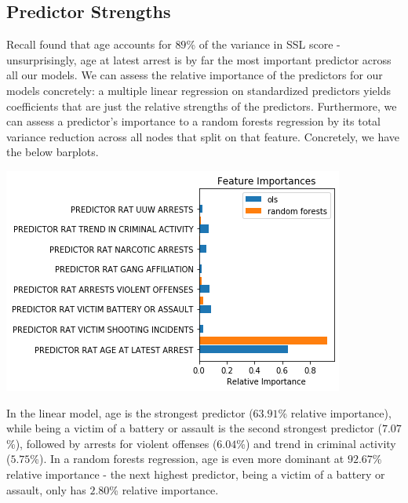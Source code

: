 \subsection{Predictor Strengths}
Recall \cite{upturn} found that age accounts for $89$\% of the variance in SSL score - unsurprisingly, age at latest arrest is by far the most important predictor across all our models. We can assess the relative importance of the predictors for our models concretely: a multiple linear regression on standardized predictors yields coefficients that are just the relative strengths of the predictors. Furthermore, we can assess a predictor's importance to a random forests regression by its total variance reduction across all nodes that split on that feature. Concretely, we have the below barplots.
\begin{center}
\includegraphics[scale=.7]{images/feature_importances.png}
\end{center}
In the linear model, age is the strongest predictor ($63.91$\% relative importance), while being a victim of a battery or assault is the second strongest predictor ($7.07$\%), followed by arrests for violent offenses ($6.04$\%) and trend in criminal activity ($5.75$\%). In a random forests regression, age is even more dominant at $92.67$\% relative importance - the next highest predictor, being a victim of a battery or assault, only has $2.80$\% relative importance.
\\\\
\newpage